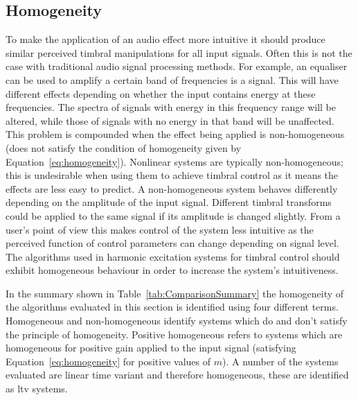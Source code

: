 	\subsection{Homogeneity}
	\label{sec:ExcitationEvaluation-Evaluation-Homogeneity}
		To make the application of an audio effect more intuitive it should produce similar perceived timbral
		manipulations for all input signals. Often this is not the case with traditional audio signal processing
		methods. For example, an equaliser can be used to amplify a certain band of frequencies is a signal. This
		will have different effects depending on whether the input contains energy at these frequencies. The
		spectra of signals with energy in this frequency range will be altered, while those of signals with no
		energy in that band will be unaffected. This problem is compounded when the effect being applied is
		non-homogeneous (does not satisfy the condition of homogeneity given by Equation~\ref{eq:homogeneity}).
		Nonlinear systems are typically non-homogeneous; this is undesirable when using them to achieve timbral
		control as it means the effects are less easy to predict. A non-homogeneous system behaves differently
		depending on the amplitude of the input signal. Different timbral transforms could be applied to the same
		signal if its amplitude is changed slightly. From a user's point of view this makes control of the system
		less intuitive as the perceived function of control parameters can change depending on signal level. The
		algorithms used in harmonic excitation systems for timbral control should exhibit homogeneous behaviour in
		order to increase the system's intuitiveness.

		In the summary shown in Table~\ref{tab:ComparisonSummary} the homogeneity of the algorithms evaluated in
		this section is identified using four different terms. Homogeneous and non-homogeneous identify systems
		which do and don't satisfy the principle of homogeneity. Positive homogeneous refers to systems which are
		homogeneous for positive gain applied to the input signal (satisfying Equation~\ref{eq:homogeneity} for
		positive values of $m$). A number of the systems evaluated are linear time variant and therefore
		homogeneous, these are identified as \acrshort{ltv} systems.

